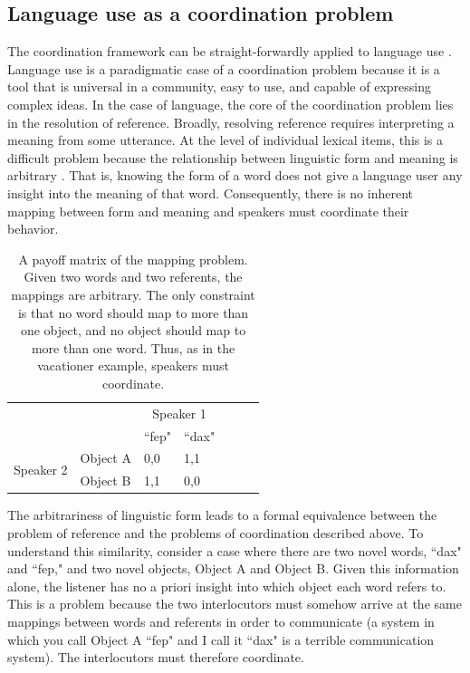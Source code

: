 \documentclass[man, noapacite, 12pt]{apa2}
\begin{document}
\subsection{Language use as a coordination problem}
The coordination  framework can be straight-forwardly applied to language use \cite{lewis1969convention}. Language use is a paradigmatic case of a coordination problem because it is a tool that is universal in a community, easy to use, and capable of expressing complex ideas. In the case of language, the core of the coordination problem lies in the resolution of reference. Broadly, resolving reference requires interpreting a meaning from some utterance. At the level of individual lexical items, this is a difficult problem because the relationship between linguistic form and meaning is arbitrary \cite{saussure, hockett1960}. That is, knowing the form of a word does not give a language user any insight into the meaning of that word. Consequently, there is no inherent mapping between form and meaning and speakers must coordinate their behavior. 

\begin{table}[t]
\begin{center}
\begin{tabular}{l p{3cm} l p{3cm} l p{3cm} l}
 &  & \multicolumn{2}{c}{Speaker 1} \\ \cline{2-4} 
\multicolumn{1}{l|}{} & \multicolumn{1}{l|}{} & \multicolumn{1}{l|}{``fep"} & \multicolumn{1}{l|}{``dax"} \\ \cline{2-4} 
\multicolumn{1}{c|}{\multirow{2}{*}{Speaker 2}} & \multicolumn{1}{l|}{Object A} & \multicolumn{1}{l|}{0,0} & \multicolumn{1}{l|}{1,1} \\ \cline{2-4} 
\multicolumn{1}{c|}{} & \multicolumn{1}{l|}{Object B} & \multicolumn{1}{l|}{1,1} & \multicolumn{1}{l|}{0,0} \\ \cline{2-4} 
\end{tabular}
\caption{A payoff matrix of the mapping problem. Given two words and two referents, the mappings are arbitrary. The only constraint is that no word should map to more than one object, and no object should map to more than one word. Thus, as in the vacationer example, speakers must coordinate.}
\end{center}
\end{table}

The arbitrariness of linguistic form leads to a formal equivalence between the problem of reference and the problems of coordination described above.  To understand this similarity, consider  a case where  there are two novel words, ``dax" and ``fep," and two novel objects, Object A and Object B. Given this information alone, the listener has no a priori insight into which object each word refers to. This is a problem because the two interlocutors must somehow arrive at the same mappings between words and referents in order to communicate (a system in which you call Object A ``fep" and I call it ``dax" is a terrible communication system). The interlocutors must therefore coordinate. 
\end{document}
